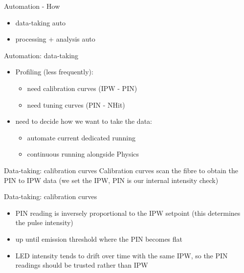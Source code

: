 \documentclass[xcolor=table]{beamer}
\begin{document}
\begin{frame}{Automation - How}
\begin{itemize}
	\item data-taking auto
	\item processing + analysis auto
\end{itemize}
\end{frame}

\begin{frame}{Automation: data-taking}
\begin{itemize}
	\item Profiling (less frequently):
	\begin{itemize}
		\item need calibration curves (IPW - PIN)
		\item need tuning curves (PIN - NHit)
	\end{itemize}
	\item need to decide how we want to take the data:
	\begin{itemize}
		\item automate current dedicated running
		\item continuous running alongside Physics
	\end{itemize}
\end{itemize}
\end{frame}

\begin{frame}{Data-taking: calibration curves}
Calibration curves scan the fibre to obtain the PIN to IPW data (we set the IPW, PIN is our internal intensity check)
\noindent{}
\end{frame}

\begin{frame}{Data-taking: calibration curves}
\begin{itemize}
	\item PIN reading is inversely proportional to the IPW setpoint (this determines the pulse intensity)
	\item up until emission threshold where the PIN becomes flat
	\item LED intensity tends to drift over time with the same IPW, so the PIN readings should be trusted rather than IPW
\end{itemize}
\end{frame}
\end{document}
